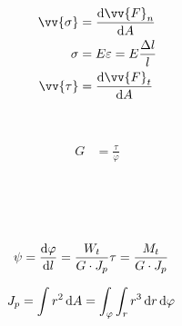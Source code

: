 \begin{boxleft}
\\
\\
\\
\\
\end{boxleft}\begin{boxrightshaded}
\begin{align}
\vv{\sigma}&=\frac{\diff\vv{F}_n}{\diff A}\\
\sigma&=E \varepsilon=E\frac{\Delta l}{l}\\
\vv{\tau}&= \frac{\diff\vv{F}_t}{\diff A}
\end{align}
\end{boxrightshaded}

\begin{boxleft}
\\
\end{boxleft}\begin{boxrightshaded}
\begin{align}
G&=\frac{\tau}{\varphi}
\end{align}
\end{boxrightshaded}

\begin{boxleft}
\\
\\
\\
\end{boxleft}\begin{boxrightshaded}
\begin{align}
\psi&=\frac{\mathop{}\!\mathrm{d} \varphi}{\mathop{}\!\mathrm{d} l}=\frac{W_t}{G\cdot J_p}\tau=\frac{M_t}{G\cdot J_p}
\end{align}
\end{boxrightshaded}

\begin{boxleft}
\end{boxleft}\begin{boxrightshaded}
\begin{align}
J_p&=\int r^2\mathop{}\!\mathrm{d} A=\int_\varphi\int_r r^3\mathop{}\!\mathrm{d} r \mathop{}\!\mathrm{d} \varphi 
\end{align}
\end{boxrightshaded}

